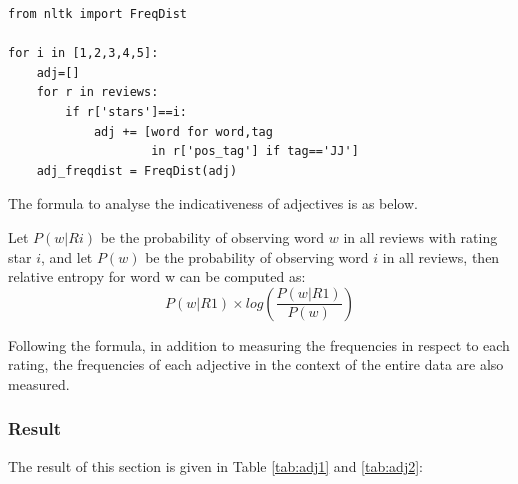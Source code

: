 \documentclass[sigconf]{acmart}
\begin{document}
\begin{verbatim}
from nltk import FreqDist

for i in [1,2,3,4,5]:
    adj=[] 
    for r in reviews:
        if r['stars']==i:
            adj += [word for word,tag 
                    in r['pos_tag'] if tag=='JJ']
    adj_freqdist = FreqDist(adj)
\end{verbatim}

The formula to analyse the indicativeness of adjectives is as below.

Let \begin{math}P(w|Ri)\end{math} be the probability of observing word \begin{math}w\end{math} in all reviews with rating star \begin{math}i\end{math}, and let \begin{math}P(w)\end{math} be the probability of observing word \begin{math}i\end{math} in all reviews, then relative entropy for word w can be computed as: \begin{equation}
    P(w|R1)\times log(\frac{P(w|R1)}{P(w)})
\end{equation}

Following the formula, in addition to measuring the frequencies in respect to each rating, the frequencies of each adjective in the context of the entire data are also measured.

\subsubsection{Result} The result of this section is given in Table \ref{tab:adj1} and \ref{tab:adj2}:
\end{document}
